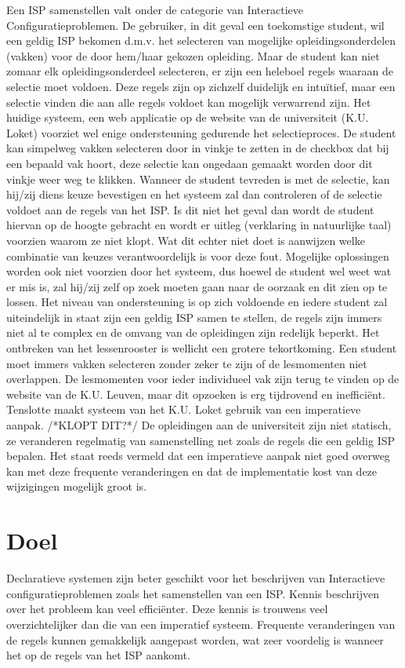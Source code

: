 Een ISP samenstellen valt onder de categorie van Interactieve Configuratieproblemen. De gebruiker, in dit geval een toekomstige student, wil een geldig ISP bekomen d.m.v. het selecteren van mogelijke opleidingsonderdelen (vakken) voor de door hem/haar gekozen opleiding. Maar de student kan niet zomaar elk opleidingsonderdeel selecteren, er zijn een heleboel regels waaraan de selectie moet voldoen. Deze regels zijn op zichzelf duidelijk en intu\"{i}tief, maar een selectie vinden die aan alle regels voldoet kan mogelijk verwarrend zijn. Het huidige systeem, een web applicatie op de website van de universiteit (K.U. Loket) voorziet wel enige ondersteuning gedurende het selectieproces. De student kan simpelweg vakken selecteren door in vinkje te zetten in de checkbox dat bij een bepaald vak hoort, deze selectie kan ongedaan gemaakt worden door dit vinkje weer weg te klikken. Wanneer de student tevreden is met de selectie, kan hij/zij diens keuze bevestigen en het systeem zal dan controleren of de selectie voldoet aan de regels van het ISP. Is dit niet het geval dan wordt de student hiervan op de hoogte gebracht en wordt er uitleg (verklaring in natuurlijke taal) voorzien waarom ze niet klopt. Wat dit echter niet doet is aanwijzen welke combinatie van keuzes verantwoordelijk is voor deze fout. Mogelijke oplossingen worden ook niet voorzien door het systeem, dus hoewel de student wel weet wat er mis is, zal hij/zij zelf op zoek moeten gaan naar  de oorzaak en dit zien op te lossen. Het niveau van ondersteuning is op zich voldoende en iedere student zal uiteindelijk in staat zijn een geldig ISP samen te stellen, de regels zijn immers niet al te complex en de omvang van de opleidingen zijn redelijk beperkt. Het ontbreken van het lessenrooster is wellicht een grotere tekortkoming. Een student moet immers vakken selecteren zonder zeker te zijn of de lesmomenten niet overlappen. De lesmomenten voor ieder individueel vak zijn terug te vinden op de website van de K.U. Leuven, maar dit opzoeken is erg tijdrovend en ineffici\"{e}nt. Tenslotte maakt systeem van het K.U. Loket  gebruik van een imperatieve aanpak. /*KLOPT DIT?*/ De opleidingen aan de universiteit zijn niet statisch, ze veranderen regelmatig van samenstelling net zoals de regels die een geldig ISP bepalen. Het staat reeds vermeld dat een imperatieve aanpak niet goed overweg kan met deze frequente veranderingen en dat de implementatie kost van deze wijzigingen mogelijk groot is. 

\section{Doel}
Declaratieve systemen zijn beter geschikt voor het beschrijven van Interactieve configuratieproblemen zoals het samenstellen van een ISP. Kennis beschrijven over het probleem kan veel effici\"{e}nter. Deze kennis is trouwens veel overzichtelijker dan die van een imperatief systeem. Frequente veranderingen van de regels kunnen gemakkelijk aangepast worden, wat zeer voordelig is wanneer het op de regels van het ISP aankomt. 


